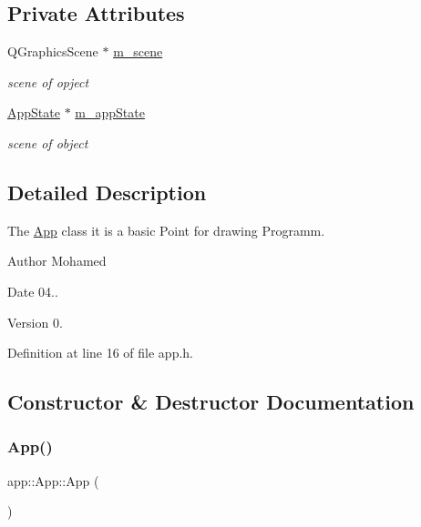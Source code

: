 \subsection*{Private Attributes}
\begin{DoxyCompactItemize}
\item 
Q\+Graphics\+Scene $\ast$ \mbox{\hyperlink{classapp_1_1_app_a76e6e4afa31f44b93cbbbbc3f137ec97}{m\+\_\+scene}}
\begin{DoxyCompactList}\small\item\em scene of opject \end{DoxyCompactList}\item 
\mbox{\hyperlink{classapp_1_1_app_state}{App\+State}} $\ast$ \mbox{\hyperlink{classapp_1_1_app_afab7fee5fb8023e0ebcb1dfeb04de85d}{m\+\_\+app\+State}}
\begin{DoxyCompactList}\small\item\em scene of object \end{DoxyCompactList}\end{DoxyCompactItemize}


\subsection{Detailed Description}
The \mbox{\hyperlink{classapp_1_1_app}{App}} class it is a basic Point for drawing Programm. 

\begin{DoxyAuthor}{Author}
Mohamed 
\end{DoxyAuthor}
\begin{DoxyDate}{Date}
04.. 
\end{DoxyDate}
\begin{DoxyVersion}{Version}
0. 
\end{DoxyVersion}


Definition at line 16 of file app.\+h.



\subsection{Constructor \& Destructor Documentation}
\mbox{\label{classapp_1_1_app_a4a289c6cb8f8d34895492cc66ed0be8e}} 
\subsubsection{\texorpdfstring{App()}{App()}}
{\footnotesize\ttfamily app\+::\+App\+::\+App (\begin{DoxyParamCaption}{ }\end{DoxyParamCaption})}



